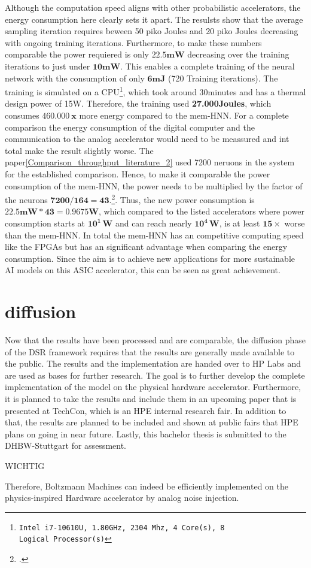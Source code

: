 Although the computation speed aligns with other probabilistic accelerators, the energy consumption here clearly sets it apart.
The resulsts show that the average sampling iteration requires beween 50 piko Joules and 20 piko Joules decreasing with ongoing training iterations.
Furthermore, to make these numbers comparable the power requiered is only \(\mathbf{22.5mW}\) decreasing over the training iterations to just under \(\mathbf{10mW}\).
This enables a complete training of the neural network with the consumption of only \(\mathbf{6 mJ}\) (720 Training iterations).
The training is simulated on a CPU\footnote{\texttt{Intel i7-10610U, 1.80GHz, 2304 Mhz, 4 Core(s), 8 Logical Processor(s)}}, which took around 30minutes and has a thermal design power of 15W.
Therefore, the training used \textbf{27.000Joules}, which consumes \(\mathbf{460.000 \ x}\) more energy compared to the \ac{mem-HNN}.
For a complete comparison the energy consumption of the digital computer and the communication to the analog accelerator would need to be meassured 
and int total make the result slightly worse. 
The paper\ref{Comparison_throughput_literature_2} used 7200 neruons in the system for the established comparison. 
Hence, to make it comparable the power consumption of the \ac{mem-HNN}, the power needs to be multiplied by the factor of the neurons \(\mathbf{7200/164=43}\).\footcite[cf.][2]{aaditAcceleratingAdaptiveParallel2023}.
Thus, the new power consumption is \(\mathbf{22.5mW * 43 = 0.9675W}\), which compared to the listed accelerators
where power consumption starts at \(\mathbf{10^1 \, W}\) and can reach nearly \(\mathbf{10^4 \, W}\), is at least \(\mathbf{15 \times}\) worse than the \ac{mem-HNN}.
In total the \ac{mem-HNN} has an competitive computing speed like the \ac{FPGA}s but has an significant advantage when comparing the energy consumption.
Since the aim is to achieve new applications for more sustainable AI models on this \ac{ASIC} accelerator, 
this can be seen as great achievement.

\section{diffusion}
Now that the results have been processed and are comparable, the diffusion phase of the \ac{DSR} framework 
requires that the results are generally made available to the public. 
The results and the implementation are handed over to HP Labs and are used as 
bases for further research.
The goal is to further develop the complete implementation of the model on the physical hardware accelerator.
Furthermore, it is planned to take the results and include them in an upcoming paper that is presented
at TechCon, which is an HPE internal research fair. 
In addition to that, the results are planned to be included and shown at public fairs that HPE plans on going in near future.
Lastly, this bachelor thesis is submitted to the DHBW-Stuttgart for assessment. 


WICHTIG

Therefore, Boltzmann Machines can indeed be efficiently implemented on the physics-inspired Hardware accelerator by analog noise injection. 